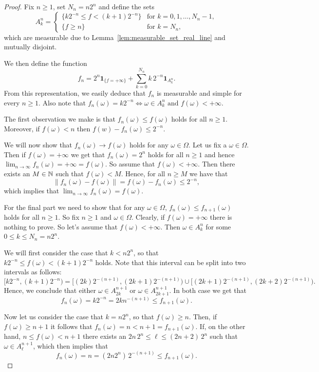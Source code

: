 \begin{proof}
Fix $n \ge 1$, set $N_n = n 2^n$ and define the sets
\[
	A_k^n = \begin{cases}
		\{ k 2^{-n} \le f < (k+1) 2^{-n}\} &\text{for } k = 0,1, \dots, N_n - 1,\\
		\{ f \ge n\} &\text{for } k = N_n,
	\end{cases}
\]
which are measurable due to Lemma~\ref{lem:measurable_set_real_line} and mutually disjoint.

We then define the function
\[
	f_n = 2^n\mathbf{1}_{\{f=+\infty\}} + \sum_{k=0}^{N_n} k \, 2^{-n} \mathbf{1}_{A_k^n}.
\]
From this representation, we easily deduce that $f_n$ is measurable and simple for every $n \ge 1$. Also note that $f_n(\omega) = k 2^{-n} \iff \omega \in A_k^n \text{ and } f(\omega) < +\infty$. 

The first observation we make is that $f_n(\omega) \le f(\omega)$ holds for all $n \ge 1$. Moreover, if $f(\omega) < n$ then $f(w) - f_n(\omega) \le 2^{-n}$. 

We will now show that $f_n(\omega) \to f(\omega)$ holds for any $\omega \in \Omega$. Let us fix a $\omega \in \Omega$. Then if $f(\omega) = +\infty$ we get that $f_n(\omega) = 2^n$ holds for all $n \ge 1$ and hence $\lim_{n \to \infty} f_n(\omega) = +\infty = f(\omega)$. So assume that $f(\omega) < +\infty$. Then there exists an $M \in \mathbb N$ such that $f(\omega) < M$. Hence, for all $n \ge M$ we have that 
\[
	\|f_n(\omega) - f(\omega)\| = f(\omega) - f_n(\omega) \le 2^{-n},
\]
which implies that $\lim_{n \to \infty} f_n(\omega) = f(\omega)$.

For the final part we need to show that for any $\omega \in \Omega$, $f_n(\omega) \le f_{n+1}(\omega)$ holds for all $n \ge 1$. So fix $n \ge 1$ and $\omega \in \Omega$. Clearly, if $f(\omega) = +\infty$ there is nothing to prove. So let's assume that $f(\omega) < +\infty$. Then $\omega \in A_k^n$ for some $0 \le k \le N_n = n 2^n$. 

We will first consider the case that $k < n 2^n$, so that $k 2^{-n} \le f(\omega) < (k+1) 2^{-n}$ holds. Note that this  interval can be split into two intervals as follows:
\[
	[k 2^{-n}, (k+1) 2^{-n}) = [(2k) 2^{-(n+1)}, (2k +1)2^{-(n+1)}) \cup [(2k +1)2^{-(n+1)}, (2k + 2)2^{-(n+1)}).
\] 
Hence, we conclude that either $\omega \in A_{2k}^{n+1}$ or $\omega \in A_{2k+1}^{n+1}$. In both case we get that 
\[
	f_n(\omega) = k2^{-n} = 2k n^{-(n+1)} \le f_{n+1}(\omega).
\]

Now let us consider the case that $k = n 2^n$, so that $f(\omega) \ge n$. Then, if $f(\omega) \ge n + 1$ it follows that $f_n(\omega) = n < n + 1 = f_{n+1}(\omega)$. If, on the other hand, $n \le f(\omega) < n + 1$ there exists an $2n \, 2^n \le \ell \le (2n+2) \, 2^n$ such that $\omega \in A_\ell^{n+1}$, which then implies that 
\[
	f_n(\omega) = n = (2n 2^{n}) \, 2^{-(n+1)} \le f_{n+1}(\omega).
\]
\end{proof}

